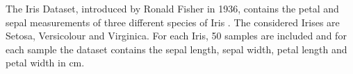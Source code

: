 The Iris Dataset, introduced by Ronald Fisher in 1936, contains the petal and sepal measurements of three different species of Iris \cite{fisher1936use}. The considered Irises are Setosa, Versicolour and Virginica. For each Iris, 50 samples are included and for each sample the dataset contains the sepal length, sepal width, petal length and petal width in cm.